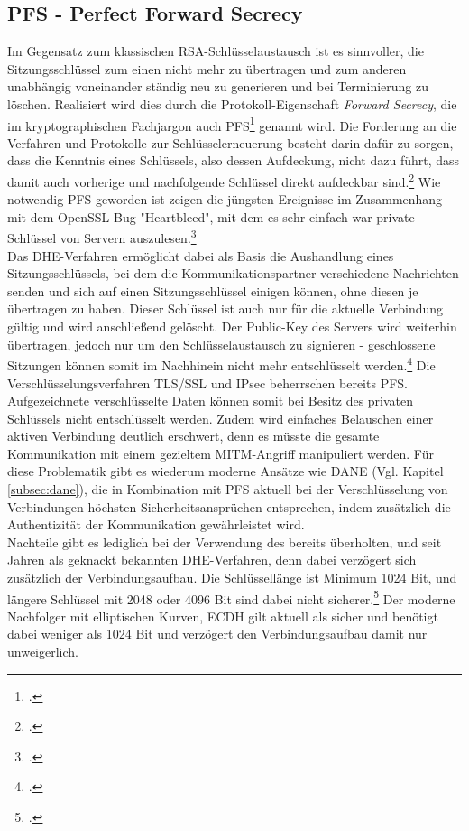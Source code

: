 \documentclass  [paper=a4,
				fontsize=12pt,
				listof=totoc,
				bibliography=totoc
				]{scrreprt}
\begin{document}
			\subsection{PFS - Perfect Forward Secrecy}
				Im Gegensatz zum klassischen RSA-Schlüsselaustausch ist es sinnvoller, die Sitzungsschlüssel
				zum einen nicht mehr zu übertragen und zum anderen unabhängig voneinander ständig neu zu generieren und bei Terminierung zu löschen. Realisiert wird dies durch die Protokoll-Eigenschaft \textit{Forward Secrecy}, die im kryptographischen Fachjargon auch \ac{PFS}\footcite[Vgl.][]{Boeck2013} genannt wird. Die \glqq Forderung an die Verfahren und Protokolle zur Schlüsselerneuerung besteht darin dafür zu sorgen, dass die Kenntnis eines Schlüssels, also dessen Aufdeckung, nicht dazu führt, dass damit auch vorherige und nachfolgende Schlüssel direkt aufdeckbar sind.\grqq\footcite[Vgl.][S. 439]{Eckert2013} Wie notwendig \ac{PFS} geworden ist zeigen die jüngsten Ereignisse im Zusammenhang mit dem OpenSSL-Bug "Heartbleed", mit dem es sehr einfach war private Schlüssel von Servern auszulesen.\footcite[][]{Zhu2014} \medskip\\
				Das \ac{DHE}-Verfahren ermöglicht dabei als Basis die Aushandlung eines Sitzungsschlüssels, bei dem die Kommunikationspartner verschiedene Nachrichten senden und sich auf einen Sitzungsschlüssel einigen können, ohne diesen je übertragen zu haben. Dieser Schlüssel ist auch nur für die aktuelle Verbindung gültig und wird anschließend gelöscht. Der Public-Key des Servers wird weiterhin übertragen, jedoch nur um den Schlüsselaustausch zu signieren - \glqq geschlossene Sitzungen können somit im Nachhinein nicht mehr entschlüsselt werden.\grqq \footcite[][]{Schulz2014} Die Verschlüsselungsverfahren \ac{TLS/SSL} und \ac{IPsec} beherrschen bereits \ac{PFS}.\medskip\\
				Aufgezeichnete verschlüsselte Daten können somit bei Besitz des privaten Schlüssels nicht entschlüsselt werden. Zudem wird einfaches Belauschen einer aktiven Verbindung deutlich erschwert, denn es müsste die gesamte Kommunikation mit einem gezieltem \ac{MITM}-Angriff manipuliert werden. Für diese Problematik gibt es wiederum moderne Ansätze wie \ac{DANE} (Vgl. Kapitel \ref{subsec:dane}), die in Kombination mit \ac{PFS} aktuell bei der Verschlüsselung von Verbindungen höchsten Sicherheitsansprüchen entsprechen, indem zusätzlich die Authentizität der Kommunikation gewährleistet wird.\medskip\\
				Nachteile gibt es lediglich bei der Verwendung des bereits überholten, und seit Jahren als geknackt bekannten \ac{DHE}-Verfahren, denn dabei verzögert sich zusätzlich der Verbindungsaufbau. Die Schlüssellänge ist Minimum 1024 Bit, und längere Schlüssel mit 2048 oder 4096 Bit sind dabei nicht sicherer.\footcite[Vgl.][]{Boeck2013} Der moderne Nachfolger mit elliptischen Kurven, \ac{ECDH} gilt aktuell als sicher und benötigt dabei weniger als 1024 Bit und verzögert den Verbindungsaufbau damit nur unweigerlich.\medskip\\
\end{document}
